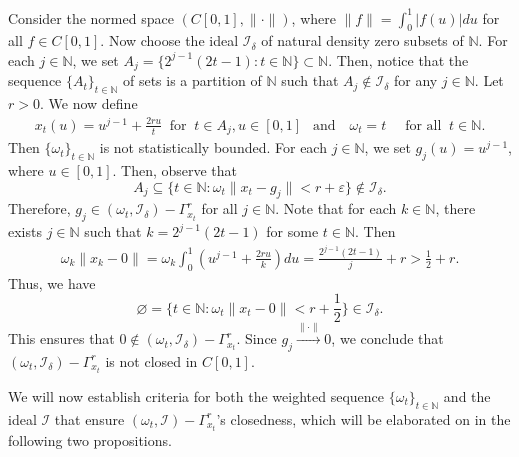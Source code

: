 \documentclass[reqno]{amsart}
\begin{document}
{%
\begin{example}\label{ex 2}
	Consider the normed space $(C[0,1],\|\cdot\|)$, where $\|f\|=\int_{0}^{1}|f(u)|du$ for all $f\in C[0,1]$. Now choose the ideal $\mathcal{I}_{\delta}$ of natural density zero subsets of $\mathbb{N}$. For each $j\in\mathbb{N}$, we set $A_{j}=\{2^{j-1}(2t-1):t\in\mathbb{N}\}\subset\mathbb{N}$. Then, notice that the sequence $\{A_t\}_{t\in\mathbb{N}}$ of sets is a partition of $\mathbb{N}$ such that $A_j\notin\mathcal{I}_{\delta}$ for any $j\in\mathbb{N}$. Let $r> 0$. We now define
	\begin{align*}
		x_{t}(u)= u^{j-1}+\frac{2ru}{t}~\mbox{ for }~t\in A_j,u\in[0,1]
		~~\text{ and }~~~
		\omega_{t}=
		t&~\mbox{ for all }~t\in \mathbb{N}. 
\end{align*}
Then $\{\omega_t\}_{t\in\mathbb{N}}$ is not statistically bounded. For each $j\in\mathbb{N}$, we set $g_{j}(u)=u^{j-1}$, where $u\in[0,1]$. Then, observe that 
$$
A_j\subseteq\{t\in\mathbb{N}:\omega_t\|x_t-g_j\|<r+\varepsilon\}\notin\mathcal{I}_{\delta}.
$$
Therefore, $g_j\in(\omega_t,\mathcal{I}_{\delta})-\Gamma_{x_t}^r$ for all $j\in\mathbb{N}$. Note that for each $k\in\mathbb{N}$, there exists $j\in\mathbb{N}$ such that $k=2^{j-1}(2t-1)$ for some $t\in\mathbb{N}$. Then
\begin{align*}
	\omega_k\|x_k-0\|=\omega_k\int_{0}^{1}(u^{j-1}+\frac{2ru}{k})du=\frac{2^{j-1}(2t-1)}{j}+r> \frac{1}{2}+r.
\end{align*}
Thus, we have
$$
\varnothing=\{t\in\mathbb{N}:\omega_t\|x_t-0\|<r+\frac{1}{2}\}\in\mathcal{I}_{\delta}.
$$
This ensures that $0\notin(\omega_t,\mathcal{I}_{\delta})-\Gamma_{x_t}^r$. Since  $g_j\xrightarrow{\|\cdot\|}0$, we conclude that $(\omega_t,\mathcal{I}_{\delta})-\Gamma_{x_t}^r$ is not closed in $C[0,1]$.
\end{example}



We will now establish criteria for both the weighted sequence $\{\omega_t\}_{t\in\mathbb{N}}$ and the ideal $\mathcal{I}$ that ensure $(\omega_t,\mathcal{I})-\Gamma_{x_t}^r$'s closedness, which will be elaborated on in the following two propositions.



}
\end{document}
